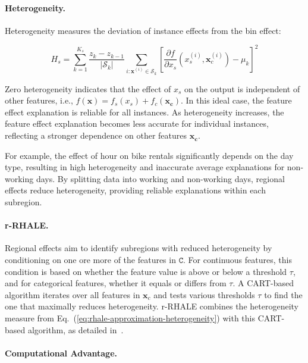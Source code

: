 \documentclass[
twocolumn,
]{ceurart}
\newcommand{\xb}{\mathbf{x}}
\newcommand{\xc}{\mathbf{x_c}}
\newcommand{\xci}{\mathbf{x}^{(i)}_c}
\begin{document}
\paragraph{Heterogeneity.}

Heterogeneity measures the deviation of instance effects from the bin effect:

\begin{equation}
  \label{eq:rhale-approximation-heterogeneity}
  H_s = \sum_{k=1}^{K_s} \frac{z_k - z_{k-1}}{|\mathcal{S}_k|}\sum_{i: \xb^{(i)} \in \mathcal{S}_k} \left [ \frac{\partial f}{\partial x_s} (x_s^{(i)}, \xci) - \mu_k \right ]^2
\end{equation}

\noindent
Zero heterogeneity indicates that the effect of $x_s$ on the output is independent of other features, i.e., \( f(\xb) = f_s(x_s) + f_c(\xc) \). In this ideal case, the feature effect explanation is reliable for all instances. As heterogeneity increases, the feature effect explanation becomes less accurate for individual instances, reflecting a stronger dependence on other features $\xc$. 

For example, the effect of hour on bike rentals significantly depends on the day type, resulting in high heterogeneity and inaccurate average explanations for non-working days. By splitting data into working and non-working days, regional effects reduce heterogeneity, providing reliable explanations within each subregion.

\paragraph{r-RHALE.}

Regional effects aim to identify subregions with reduced heterogeneity by conditioning on one ore more of the features in \( \mathtt{C} \). For continuous features, this condition is based on whether the feature value is above or below a threshold \( \tau \), and for categorical features, whether it equals or differs from \( \tau \). A CART-based algorithm iterates over all features in \( \xb_c \) and tests various thresholds \( \tau \) to find the one that maximally reduces heterogeneity.
r-RHALE combines the heterogeneity measure from Eq.~(\ref{eq:rhale-approximation-heterogeneity}) with this CART-based algorithm, as detailed in~\cite{herbinger2023decomposing, gkolemis2024effector}.

\paragraph{Computational Advantage.}
\end{document}
